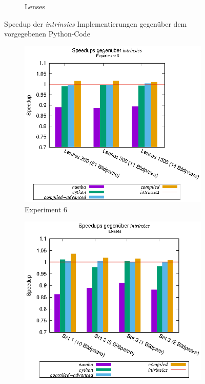 \begin{center}
\begin{figure}[htbp]
\begin{subfigure}[b]{0.54\textwidth}
			\caption{Lenses}
			\label{fig:speedups_intrinsics_lenses}
		\end{subfigure}
		\caption{Speedup der \textit{intrinsics} Implementierungen gegenüber dem vorgegebenen Python-Code}
		\label{fig:speedups_intrinsics}
	\end{figure}
\end{center}

\begin{center}
	\begin{figure}[htbp]
		\begin{subfigure}[b]{0.54\textwidth}
			\centering
			\includegraphics[width=\textwidth]{pdf/speedups_exp6}
			\caption{Experiment 6}
			\label{fig:speedups_exp6}
		\end{subfigure}
		\hspace{-0.9cm}
		\begin{subfigure}[b]{0.54\textwidth}
			\centering
			\includegraphics[width=\textwidth]{pdf/speedups_lenses}

\end{subfigure}
\end{figure}
\end{center}
